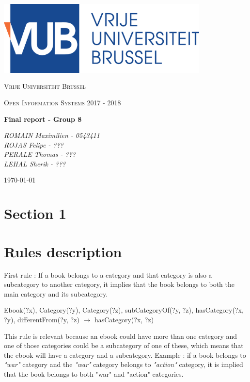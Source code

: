 \documentclass[a4paper,12pt]{article}
\begin{document}
\begin{titlepage}
	\centering
	\includegraphics[width=0.8\textwidth]{logo.eps}\par\vspace{1cm}
	{\scshape\LARGE Vrije Universiteit Brussel\par}
	\vspace{1cm}
	{\scshape\Large Open Information Systems 2017 - 2018\par}
	\vspace{1.5cm}
	{\huge\bfseries Final report - Group 8\par}
	\vspace{2cm}
	{\Large\itshape ROMAIN Maximilien - 0543411\\ ROJAS Felipe - ???\\PERALE Thomas - ???\\ LEHAL Sherik - ???\par}
	\vfill

	{\large \today\par}
\end{titlepage}

\newpage

\section{Section 1}

\section{Rules description}
First rule : If a book belongs to a category and that category is also a subcategory to another
category, it implies that the book belongs to both the main category and its subcategory.

Ebook(?x), Category(?y), Category(?z), subCategoryOf(?y, ?z), hasCategory(?x, ?y), differentFrom(?y, ?z) $\rightarrow$ hasCategory(?x, ?z)

This rule is relevant because an ebook could have more than one category and one of those categories could
be a subcategory of one of these, which means that the ebook will have a category and a subcategory.
Example : if a book belongs to \textit{"war"} category and the \textit{"war"} category belongs to \textit{"action"} category,
it is implied that the book belongs to both "war" and "action" categories.\\
\end{document}
